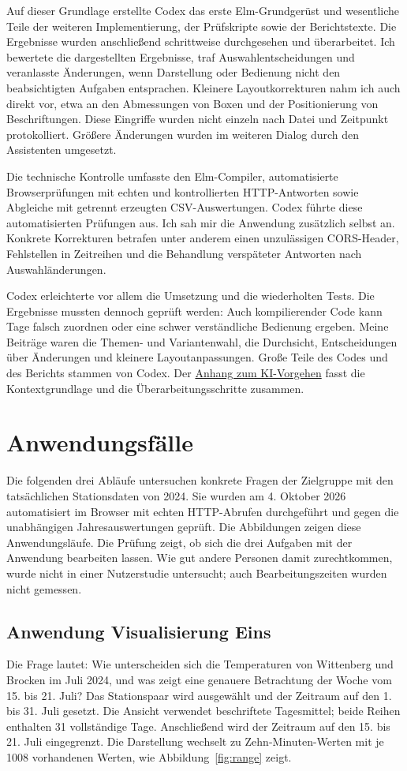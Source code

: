 \documentclass[usegeometry=true]{scrartcl}
\begin{document}
Auf dieser Grundlage erstellte Codex das erste Elm-Grundgerüst und
wesentliche Teile der weiteren Implementierung, der Prüfskripte sowie
der Berichtstexte. Die Ergebnisse wurden anschließend schrittweise
durchgesehen und überarbeitet. Ich bewertete die dargestellten Ergebnisse,
traf Auswahlentscheidungen und veranlasste Änderungen, wenn Darstellung
oder Bedienung nicht den beabsichtigten Aufgaben entsprachen. Kleinere
Layoutkorrekturen nahm ich auch direkt vor, etwa an den Abmessungen von
Boxen und der Positionierung von Beschriftungen. Diese Eingriffe wurden
nicht einzeln nach Datei und Zeitpunkt protokolliert. Größere Änderungen
wurden im weiteren Dialog durch den Assistenten umgesetzt.

Die technische Kontrolle umfasste den Elm-Compiler, automatisierte
Browserprüfungen mit echten und kontrollierten HTTP-Antworten sowie
Abgleiche mit getrennt erzeugten CSV-Auswertungen. Codex führte diese automatisierten Prüfungen aus.
Ich sah mir die Anwendung zusätzlich selbst an. Konkrete Korrekturen betrafen unter anderem einen
unzulässigen CORS-Header, Fehlstellen in Zeitreihen und die Behandlung
verspäteter Antworten nach Auswahländerungen.

Codex erleichterte vor allem die Umsetzung und die wiederholten Tests.
Die Ergebnisse mussten dennoch geprüft werden: Auch kompilierender Code
kann Tage falsch zuordnen oder eine schwer verständliche Bedienung ergeben.
Meine Beiträge waren die Themen- und Variantenwahl, die Durchsicht,
Entscheidungen über Änderungen und kleinere Layoutanpassungen.
Große Teile des Codes und des Berichts stammen von Codex. Der \hyperref[app:ai-workflow]{Anhang zum KI-Vorgehen} fasst die
Kontextgrundlage und die Überarbeitungsschritte zusammen.

\section{Anwendungsfälle}
Die folgenden drei Abläufe untersuchen konkrete Fragen der Zielgruppe mit
den tatsächlichen Stationsdaten von 2024. Sie wurden am 4. Oktober 2026
automatisiert im Browser mit echten HTTP-Abrufen durchgeführt und gegen
die unabhängigen Jahresauswertungen geprüft. Die Abbildungen zeigen diese Anwendungsläufe.
Die Prüfung zeigt, ob sich die drei Aufgaben mit der Anwendung bearbeiten
lassen. Wie gut andere Personen damit zurechtkommen, wurde nicht in einer
Nutzerstudie untersucht; auch Bearbeitungszeiten wurden nicht gemessen.

\subsection{Anwendung Visualisierung Eins}
Die Frage lautet: Wie unterscheiden sich die Temperaturen von Wittenberg
und Brocken im Juli 2024, und was zeigt eine genauere Betrachtung der
Woche vom 15. bis 21. Juli? Das Stationspaar wird ausgewählt und der
Zeitraum auf den 1. bis 31. Juli gesetzt. Die Ansicht verwendet
beschriftete Tagesmittel; beide Reihen enthalten 31 vollständige Tage.
Anschließend wird der Zeitraum auf den 15. bis 21. Juli eingegrenzt.
Die Darstellung wechselt zu Zehn-Minuten-Werten mit je 1008 vorhandenen
Werten, wie Abbildung~\ref{fig:range} zeigt.
\end{document}
